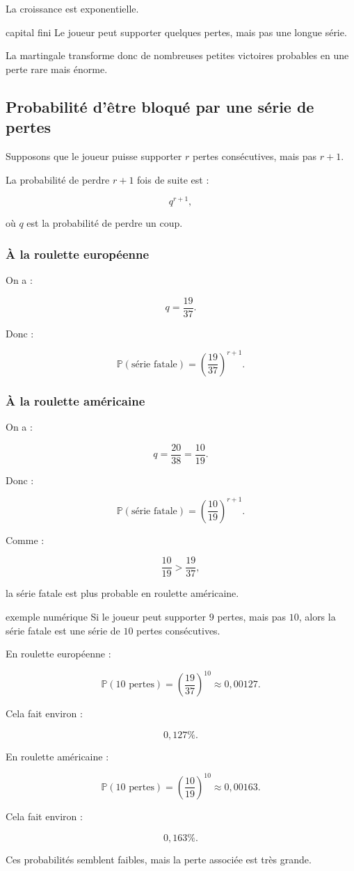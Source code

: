 \documentclass[11pt,a4paper]{article}
\newcommand{\Prob}{\mathbb{P}}
\begin{document}
La croissance est exponentielle.

\begin{conclusionbox}{capital fini}
Le joueur peut supporter quelques pertes, mais pas une longue série.

La martingale transforme donc de nombreuses petites victoires probables en une perte rare mais énorme.
\end{conclusionbox}

\subsection{Probabilité d'être bloqué par une série de pertes}

Supposons que le joueur puisse supporter \(r\) pertes consécutives, mais pas \(r+1\).

La probabilité de perdre \(r+1\) fois de suite est :

\[
q^{r+1},
\]

où \(q\) est la probabilité de perdre un coup.

\subsubsection*{À la roulette européenne}

On a :

\[
q=\frac{19}{37}.
\]

Donc :

\[
\Prob(\text{série fatale})
=
\left(\frac{19}{37}\right)^{r+1}.
\]

\subsubsection*{À la roulette américaine}

On a :

\[
q=\frac{20}{38}=\frac{10}{19}.
\]

Donc :

\[
\Prob(\text{série fatale})
=
\left(\frac{10}{19}\right)^{r+1}.
\]

Comme :

\[
\frac{10}{19}>\frac{19}{37},
\]

la série fatale est plus probable en roulette américaine.

\begin{resolution}{exemple numérique}
Si le joueur peut supporter \(9\) pertes, mais pas \(10\), alors la série fatale est une série de \(10\) pertes consécutives.

En roulette européenne :

\[
\Prob(\text{10 pertes})=
\left(\frac{19}{37}\right)^{10}
\approx 0{,}00127.
\]

Cela fait environ :

\[
0{,}127\%.
\]

En roulette américaine :

\[
\Prob(\text{10 pertes})=
\left(\frac{10}{19}\right)^{10}
\approx 0{,}00163.
\]

Cela fait environ :

\[
0{,}163\%.
\]

Ces probabilités semblent faibles, mais la perte associée est très grande.
\end{resolution}
\end{document}

